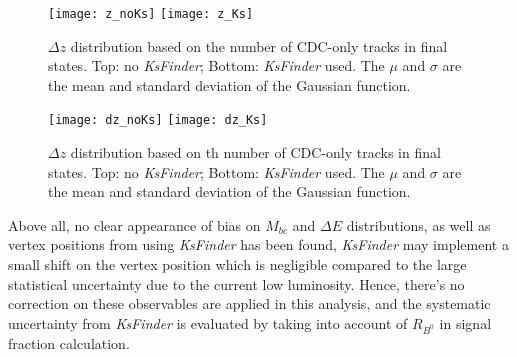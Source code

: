 \begin{figure}[htpb]
	\centering
	\texttt{[image: z\_noKs]}
	\texttt{[image: z\_Ks]}
	\caption{$\Delta z$ distribution based on the number of CDC-only tracks in final states. Top: no \textit{KsFinder}; Bottom: \textit{KsFinder} used. The $\mu$ and $\sigma$ are the mean and standard deviation of the Gaussian function.}
	\label{fig:bias-z}
\end{figure}
\begin{figure}[htpb]
	\centering
	\texttt{[image: dz\_noKs]}
	\texttt{[image: dz\_Ks]}
	\caption{$\Delta z$ distribution based on th number of CDC-only tracks in final states. Top: no \textit{KsFinder}; Bottom: \textit{KsFinder} used. The $\mu$ and $\sigma$ are the mean and standard deviation of the Gaussian function.}
	\label{fig:bias-zerr}
\end{figure}
Above all, no clear appearance of bias on $M_{bc}$ and $\Delta E$ distributions, as well as vertex positions from using \textit{KsFinder} has been found, \textit{KsFinder} may implement a small shift on the vertex position which is negligible compared to the large statistical uncertainty due to the current low luminosity. Hence, there's no correction on these observables are applied in this analysis, and the systematic uncertainty from \textit{KsFinder} is evaluated by taking into account of $R_{B^0}$ in signal fraction calculation.
